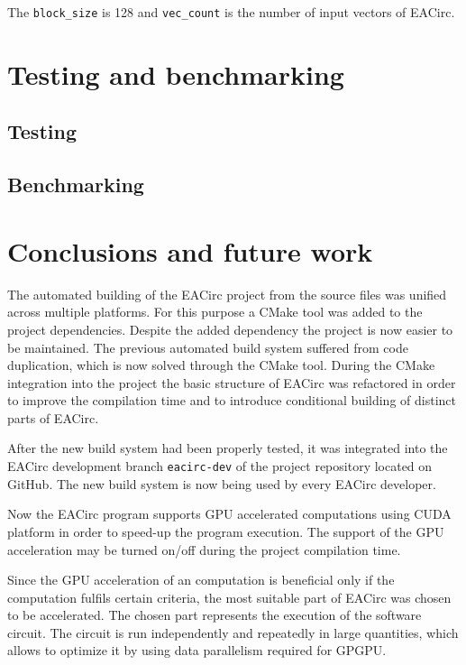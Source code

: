 \documentclass[12pt,oneside]{fithesis2}
\begin{document}
\noindent
The \texttt{block\_size} is 128 and \texttt{vec\_count} is the number of input vectors of EACirc.

\chapter{Testing and benchmarking}

\section{Testing}
\section{Benchmarking}

\chapter{Conclusions and future work}

The automated building of the EACirc project from the source files was unified across multiple platforms. For this purpose a CMake tool was added to the project dependencies. Despite the added dependency the project is now easier to be maintained. The previous automated build system suffered from code duplication, which is now solved through the CMake tool. During the CMake integration into the project the basic structure of EACirc was refactored in order to improve the compilation time and to introduce conditional building of distinct parts of EACirc.

After the new build system had been properly tested, it was integrated into the EACirc development branch \texttt{eacirc-dev} of the project repository located on GitHub. The new build system is now being used by every EACirc developer.

\bigskip

Now the EACirc program supports GPU accelerated computations using CUDA platform in order to speed-up the program execution. The support of the GPU acceleration may be turned on/off during the project compilation time.

Since the GPU acceleration of an computation is beneficial only if the computation fulfils certain criteria, the most suitable part of EACirc was chosen to be accelerated. The chosen part represents the execution of the software circuit. The circuit is run independently and repeatedly in large quantities, which allows to optimize it by using data parallelism required for GPGPU.
\end{document}
